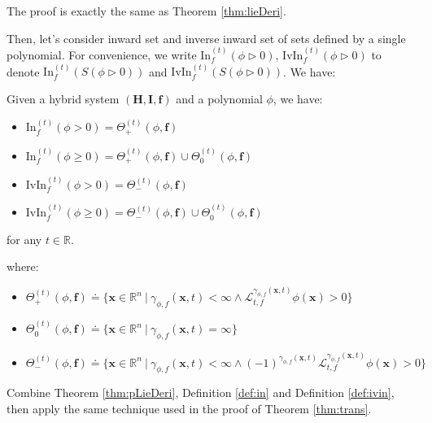 \documentclass{article}
\begin{document}
\begin{Proof}
The proof is exactly the same as Theorem \ref{thm:lieDeri}. 
\end{Proof}

Then, let's consider inward set and inverse inward set of sets defined by a single polynomial. For convenience, we write $\mathrm{In}_f^{(t)}(\phi \rhd 0)$,  $\mathrm{IvIn}_f^{(t)}(\phi \rhd 0)$ to denote $\mathrm{In}_f^{(t)}(S(\phi \rhd 0))$ and $\mathrm{IvIn}_f^{(t)}(S(\phi \rhd 0))$. We have: 

\begin{Theorem}
\label{thm:polyInIvin}
Given a hybrid system $(\boldsymbol{H}, \boldsymbol{I}, \boldsymbol{f})$ and a polynomial $\phi$, we have: 
\begin{itemize}
	\item $\mathrm{In}_f^{(t)}(\phi > 0) = \Theta_+^{(t)}(\phi, \boldsymbol{f})$
	\item $\mathrm{In}_f^{(t)}(\phi \geq 0) = \Theta_+^{(t)}(\phi, \boldsymbol{f}) \cup \Theta_0^{(t)}(\phi, \boldsymbol{f})$
	\item $\mathrm{IvIn}_f^{(t)}(\phi > 0) = \Theta_-^{(t)}(\phi, \boldsymbol{f})$
	\item $\mathrm{IvIn}_f^{(t)}(\phi \geq 0) = \Theta_-^{(t)}(\phi, \boldsymbol{f}) \cup \Theta_0^{(t)}(\phi, \boldsymbol{f})$
\end{itemize}
for any $t \in \mathbb{R}$.

where: 
\begin{itemize}
	\item $\Theta_+^{(t)}(\phi, \boldsymbol{f}) \doteq \{ \boldsymbol{x} \in \mathbb{R}^n\ |\ \gamma_{\phi, f}(\boldsymbol{x}, t) < \infty \wedge \mathcal{L}_{t, f}^{\gamma_{\phi, f}(\boldsymbol{x}, t)} \phi(\boldsymbol{x}) > 0 \}$
	\item $\Theta_0^{(t)}(\phi, \boldsymbol{f}) \doteq \{ \boldsymbol{x} \in \mathbb{R}^n\ |\ \gamma_{\phi, f}(\boldsymbol{x}, t) = \infty\}$
	\item $\Theta_-^{(t)}(\phi, \boldsymbol{f}) \doteq \{ \boldsymbol{x} \in \mathbb{R}^n\ |\ \gamma_{\phi, f}(\boldsymbol{x}, t) < \infty \wedge (-1)^{\gamma_{\phi, f}(\boldsymbol{x}, t)} \mathcal{L}_{t, f}^{\gamma_{\phi, f}(\boldsymbol{x}, t)} \phi(\boldsymbol{x}) > 0 \}$
\end{itemize}
\end{Theorem}

\begin{Proof}
Combine Theorem \ref{thm:pLieDeri}, Definition \ref{def:in} and Definition \ref{def:ivin}, then apply the same technique used in the proof of Theorem \ref{thm:trans}.
\end{Proof}
\end{document}
